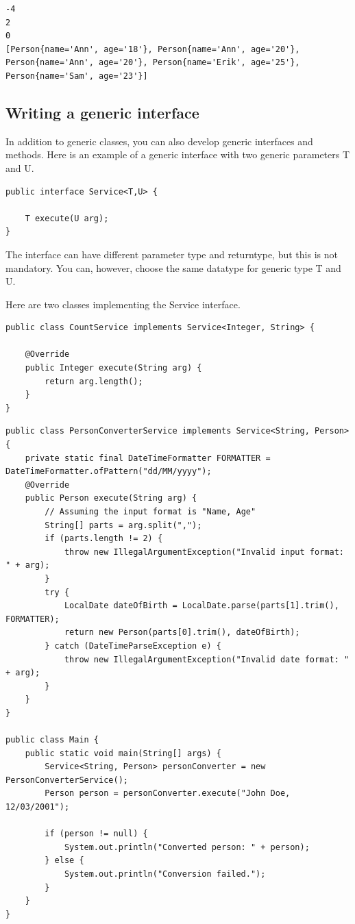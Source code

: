 \begin{verbatim}
-4
2
0
[Person{name='Ann', age='18'}, Person{name='Ann', age='20'}, Person{name='Ann', age='20'}, Person{name='Erik', age='25'}, Person{name='Sam', age='23'}]
\end{verbatim}



\subsection{Writing a generic interface}

In addition to generic classes, you can also develop generic interfaces and methods. Here is an example of a generic interface with two generic parameters T and U.

\begin{lstlisting}
public interface Service<T,U> {

	T execute(U arg);
}
\end{lstlisting}

The interface can have different parameter type and returntype, but this is not mandatory. You can, however, choose the same datatype for generic type T and U.

Here are two classes implementing the Service interface.

\begin{lstlisting}
public class CountService implements Service<Integer, String> {

	@Override
	public Integer execute(String arg) {
		return arg.length();
	}
}
\end{lstlisting}

\begin{lstlisting}
public class PersonConverterService implements Service<String, Person> {
    private static final DateTimeFormatter FORMATTER = DateTimeFormatter.ofPattern("dd/MM/yyyy");
    @Override
    public Person execute(String arg) {
        // Assuming the input format is "Name, Age"
        String[] parts = arg.split(",");
        if (parts.length != 2) {
            throw new IllegalArgumentException("Invalid input format: " + arg);
        }
        try {
            LocalDate dateOfBirth = LocalDate.parse(parts[1].trim(), FORMATTER);
            return new Person(parts[0].trim(), dateOfBirth);
        } catch (DateTimeParseException e) {
            throw new IllegalArgumentException("Invalid date format: " + arg);
        }
    }
}

public class Main {
    public static void main(String[] args) {
        Service<String, Person> personConverter = new PersonConverterService();
        Person person = personConverter.execute("John Doe, 12/03/2001");

        if (person != null) {
            System.out.println("Converted person: " + person);
        } else {
            System.out.println("Conversion failed.");
        }
    }
}
\end{lstlisting}

